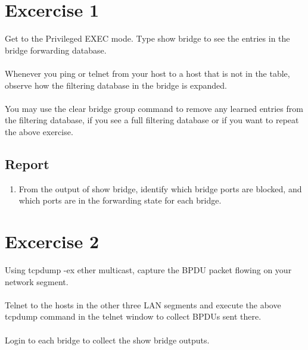\documentclass[10pt,a4paper]{article}
\numberwithin{equation}{section}
\numberwithin{figure}{section}
\numberwithin{table}{section}
\begin{document}
\iffalse
\section{Excercise 1}
   Get to the Privileged EXEC mode. Type show bridge to see the entries in the bridge forwarding database. \\ 
\\
Whenever you ping or telnet from your host to a host that is not in the table, observe how the filtering database in the bridge is expanded. \\
\\
You may use the clear bridge group command to remove any learned entries from the filtering database, if you see a full filtering database or if you want to repeat the above exercise. 

   \subsection*{Report}
    \begin{enumerate}
        \item From the output of show bridge, identify which bridge ports are blocked, and which ports are in the forwarding state for each bridge.
    \end{enumerate}

\section*{Excercise 2}
   Using tcpdump -ex ether multicast, capture the BPDU packet flowing on your network segment. \\
\\
Telnet to the hosts in the other three LAN segments and execute the above tcpdump command in the telnet window to collect BPDUs sent there. \\
\\
Login to each bridge to collect the show bridge outputs.
\end{document}
